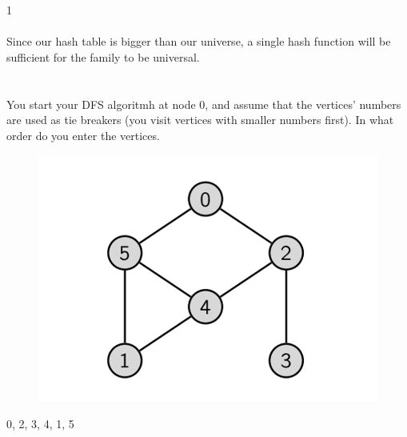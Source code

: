 \documentclass [12pt]{article}
\begin{document}
\begin{Solution}
1
\paragraph{}
Since our hash table is bigger than our universe, a single hash function will be sufficient for the family to be universal.
\end{Solution}


\section{} You start your DFS algoritmh at node $0$, and assume that the vertices' numbers are used as tie breakers (you visit vertices with smaller numbers first). In what order do you enter the vertices.
\begin{figure}[H]
    \centering
    \includegraphics[scale=0.5]{1.png} 
    \label{fig:my_label}
\end{figure}

\begin{Solution}
0, 2, 3, 4, 1, 5
\end{Solution}
\end{document}
